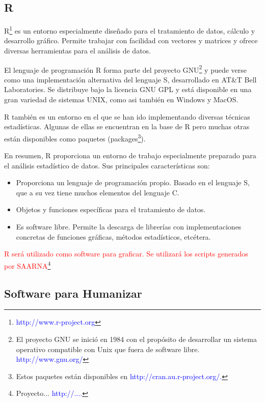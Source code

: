 \documentclass[12pt,a4paper,spanish]{article}
\begin{document}
	\subsection{R}
		\par \textsc{R}\footnote{\textcolor{blue}{http://www.r-project.org}} es un entorno especialmente diseñado para el tratamiento de datos, cálculo y 			desarrollo gráfico. Permite trabajar con facilidad con vectores y matrices y ofrece diversas herramientas para el análisis de datos.
		\par El lenguaje de programación \textsc{R} forma parte del proyecto GNU\footnote{El proyecto GNU se inició en 1984 con el propósito de 	
		desarrollar un sistema operativo compatible con Unix que fuera de software libre. \textcolor{blue}{http://www.gnu.org/}} y puede verse como una 		implementación alternativa del lenguaje \textsc{S}, desarrollado en AT\&T Bell Laboratories. Se distribuye bajo la licencia GNU GPL y está 			disponible en una gran variedad de sistemas UNIX, como asi también en Windows y MacOS.
		\par \textsc{R} también es un entorno en el que se han ido implementando diversas técnicas estadísticas. Algunas de ellas se encuentran en la base 			de R pero muchas otras están disponibles como paquetes (packages\footnote{Estos paquetes están disponibles en 
		\textcolor{blue}{http://cran.au.r-project.org/.}}).
		\par En resumen, R proporciona un entorno de trabajo especialmente preparado para el análisis estadístico de datos. Sus principales 		
		características son:
		\begin{itemize}
			\item Proporciona un lenguaje de programación propio. Basado en el lenguaje S, que a su vez tiene muchos elementos del lenguaje C. 
			\item Objetos y funciones específicas para el tratamiento de datos.
			\item Es software libre. Permite la descarga de librerías con implementaciones concretas de funciones gráficas, métodos estadísticos, etcétera.
		\end{itemize}
		\textcolor{red}{\textsc{R} será utilizado como software para graficar. Se utilizará los scripts generados por SAARNA\footnote{Proyecto... 			\textcolor{blue}{http://....}}}

	\subsection{Software para Humanizar}
\end{document}
